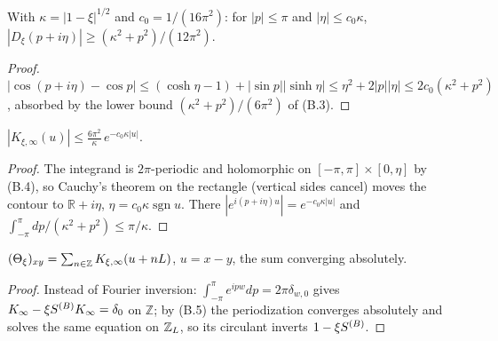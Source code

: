 \begin{lemma}\label{eq:B.4}
  \leanok
  With $\kappa=|1-\xi|^{1/2}$ and $c_0=1/(16\pi^2)$: for $|p|\le\pi$ and $|\eta|\le c_0\kappa$,
  $|D_\xi(p+i\eta)|\ge(\kappa^2+p^2)/(12\pi^2)$.
\end{lemma}
\begin{proof}\leanok{}
  $|\cos(p+i\eta)-\cos p|\le(\cosh\eta-1)+|\sin p||\sinh\eta|\le\eta^2+2|p||\eta|
  \le2c_0(\kappa^2+p^2)$, absorbed by the lower bound $(\kappa^2+p^2)/(6\pi^2)$ of (B.3).
\end{proof}

\begin{lemma}\label{eq:B.5}
  \leanok
  $|K_{\xi,\infty}(u)|\le\frac{6\pi^2}{\kappa}\,e^{-c_0\kappa|u|}$.
\end{lemma}
\begin{proof}\leanok{}
  The integrand is $2\pi$-periodic and holomorphic on $[-\pi,\pi]\times[0,\eta]$ by (B.4),
  so Cauchy's theorem on the rectangle (vertical sides cancel) moves the contour to
  $\mathbb R+i\eta$, $\eta=c_0\kappa\operatorname{sgn}u$.  There $|e^{i(p+i\eta)u}|=e^{-c_0\kappa|u|}$
  and $\int_{-\pi}^{\pi}dp/(\kappa^2+p^2)\le\pi/\kappa$.
\end{proof}

\begin{lemma}\label{eq:B.2-per}
  \leanok
  $(\Theta_\xi)_{xy}=\sum_{n\in\mathbb Z}K_{\xi,\infty}(u+nL)$, $u=x-y$, the sum converging
  absolutely.
\end{lemma}
\begin{proof}\leanok{}
  Instead of Fourier inversion: $\int_{-\pi}^{\pi}e^{ipw}dp=2\pi\delta_{w,0}$ gives
  $K_\infty-\xi S^{(B)} K_\infty=\delta_0$ on $\mathbb Z$; by (B.5) the periodization converges
  absolutely and solves the same equation on $\mathbb{Z}_L$, so its circulant inverts $1-\xi S^{(B)}$.
\end{proof}

